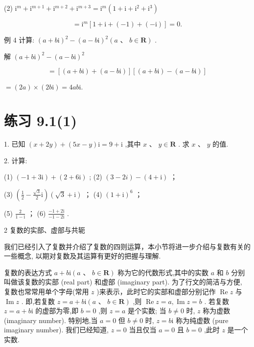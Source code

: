 \documentclass[10pt]{article}
\begin{document}
(2) \({\mathrm{i}}^{m} + {\mathrm{i}}^{m + 1} + {\mathrm{i}}^{m + 2} + {\mathrm{i}}^{m + 3} = {\mathrm{i}}^{m}\left( {1 + \mathrm{i} + {\mathrm{i}}^{2} + {\mathrm{i}}^{3}}\right)\)

\[
= {\mathrm{i}}^{m}\left\lbrack  {1 + \mathrm{i} + \left( {-1}\right)  + \left( {-\mathrm{i}}\right) }\right\rbrack   = 0.
\]

例 4 计算: \({\left( a + b\mathrm{i}\right) }^{2} - {\left( a - b\mathrm{i}\right) }^{2}\left( {a\text{ 、 }b \in  \mathbf{R}}\right)\) .

解 \({\left( a + b\mathrm{i}\right) }^{2} - {\left( a - b\mathrm{i}\right) }^{2}\)

\[
= \left\lbrack  {\left( {a + b\mathrm{i}}\right)  + \left( {a - b\mathrm{i}}\right) }\right\rbrack  \left\lbrack  {\left( {a + b\mathrm{i}}\right)  - \left( {a - b\mathrm{i}}\right) }\right\rbrack
\]

\(= \left( {2a}\right)  \times  \left( {{2b}\mathrm{i}}\right)  = {4ab}\mathrm{i}.\)

\section*{练习 9.1(1)}

1. 已知 \(\left( {x + {2y}}\right)  + \left( {{5x} - y}\right) \mathrm{i} = 9 + \mathrm{i}\) ,其中 \(x\text{ 、 }y \in  \mathbf{R}\) . 求 \(x\text{ 、 }y\) 的值.

2. 计算:

(1) \(\left( {-1 + 3\mathrm{i}}\right)  + \left( {2 + 6\mathrm{i}}\right)\) ; (2) \(\left( {3 - {2i}}\right)  - \left( {4 + \mathrm{i}}\right)\) ；

(3) \(\left( {\frac{1}{2} - \frac{\sqrt{3}}{2}\mathrm{i}}\right) \left( {\sqrt{3} + \mathrm{i}}\right)\) ； (4) \({\left( 1 + \mathrm{i}\right) }^{6}\) ；

(5) \(\frac{2}{1 - \mathrm{i}}\) ； (6) \(\frac{-1 + 2\mathrm{i}}{-1 - 2\mathrm{i}}\) .

2 复数的实部、虚部与共轭

我们已经引入了复数并介绍了复数的四则运算，本小节将进一步介绍与复数有关的一些概念, 以期对复数及其运算有更好的把握与理解.

复数的表达方式 \(a + b\mathrm{i}\left( {a\text{ 、 }b \in  \mathbf{R}}\right)\) 称为它的代数形式,其中的实数 \(a\) 和 \(b\) 分别叫做该复数的实部 (real part) 和虚部 (imaginary part). 为了行文的简洁与方便, 复数也常常用单个字母(常用 \(z\) )来表示，此时它的实部和虚部分别记作 \(\operatorname{Re}z\) 与 \(\operatorname{Im}z\) . 即,若复数 \(z = a + b\mathrm{i}\left( {a\text{ 、 }b \in  \mathbf{R}}\right)\) ,则 \(\operatorname{Re}z = a,\operatorname{Im}z = b\) . 若复数 \(z = a + b\mathrm{i}\) 的虚部为零,即 \(b = 0\) ,则 \(z = a\) 是个实数; 当 \(b \neq  0\) 时, \(z\) 称为虚数 (imaginary number). 特别地,当 \(a = 0\) 但 \(b \neq  0\) 时, \(z = b\mathrm{i}\) 称为纯虚数 (pure imaginary number). 我们已经知道, \(z = 0\) 当且仅当 \(a = 0\) 且 \(b = 0\) ,此时 \(z\) 是一个实数.
\end{document}
